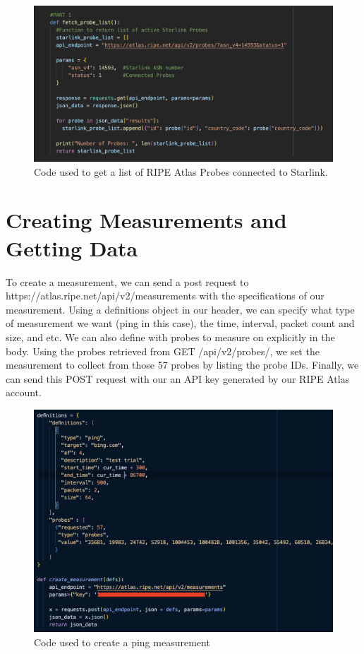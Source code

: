 \documentclass[acmsmall]{acmart}
\begin{document}
\begin{figure}[h]
  \centering
  \includegraphics[width=\linewidth]{ProbeSearch.png}
  \caption{Code used to get a list of RIPE Atlas Probes connected to Starlink.}
\end{figure}


\section{Creating Measurements and Getting Data}

To create a measurement, we can send a post request to https://atlas.ripe.net/api/v2/measurements with the specifications of our  measurement. Using a definitions object in our header, we can specify what type of measurement we want (ping in this case), the time, interval, packet count and size, and etc. We can also define with probes to measure on explicitly in the body. Using the probes retrieved from GET /api/v2/probes/, we set the measurement to collect from those 57 probes by listing the probe IDs. Finally, we can send this POST request with our an API key generated by our RIPE Atlas account.

\begin{figure}[h]
  \centering
  \includegraphics[width=\linewidth]{create_measurement.png}
  \caption{Code used to create a ping measurement}
\end{figure}
\end{document}
